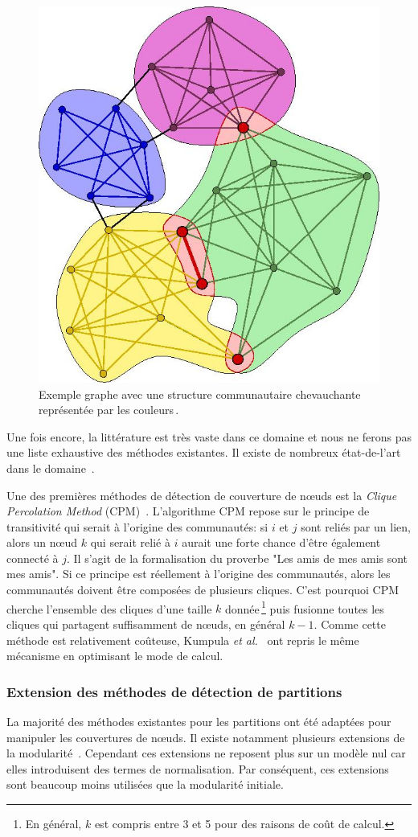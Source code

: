 \begin{figure}
	\centering
	\includegraphics[width=0.31\linewidth]{img/Intro/Illustration_of_overlapping_communities.jpg}
	\caption{Exemple graphe avec une structure communautaire chevauchante représentée par les couleurs\,\protect\footnotemark.}
	\label{fig:ex_overlap_communaute}
\end{figure}

Une fois encore, la littérature est très vaste dans ce domaine et nous ne ferons pas une liste exhaustive des méthodes existantes.
Il existe de nombreux état-de-l'art dans le domaine~\cite{ Kanawati2014, Xie2013,Bandyopadhyay2015, Hric2014a}.

Une des premières méthodes de détection de couverture de n\oe uds est la \emph{Clique Percolation Method} (CPM)~\cite{Palla2005}.
L'algorithme CPM repose sur le principe de transitivité qui serait à l'origine des communautés: si $i$ et $j$ sont reliés par un lien, alors un n\oe ud $k$ qui serait relié à $i$ aurait une forte chance d'être également connecté à $j$.
Il s'agit de la formalisation du proverbe "Les amis de mes amis sont mes amis".
Si ce principe est réellement à l'origine des communautés, alors les communautés doivent être composées de plusieurs cliques.
C'est pourquoi CPM cherche l'ensemble des cliques d'une taille $k$ donnée\,\footnote{En général, $k$ est compris entre 3 et 5 pour des raisons de coût de calcul.} puis fusionne toutes les cliques qui partagent suffisamment de n\oe uds, en général $k-1$. 
Comme cette méthode est relativement coûteuse, Kumpula \emph{et al.}~\cite{Kumpula2008} ont repris le même mécanisme en optimisant le mode de calcul.

\subsubsection{Extension des méthodes de détection de partitions}

La majorité des méthodes existantes pour les partitions ont été adaptées pour manipuler les couvertures de n\oe uds.
Il existe notamment plusieurs extensions de la modularité~\cite{Shen2009,Nicosia2009}.
Cependant ces extensions ne reposent plus sur un modèle nul car elles introduisent des termes de normalisation.
Par conséquent, ces extensions sont beaucoup moins utilisées que la modularité initiale.

